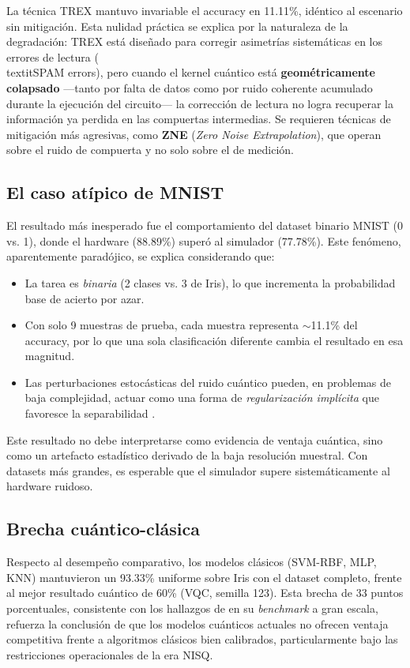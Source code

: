 La t\'ecnica TREX mantuvo invariable el accuracy en 11.11\%, id\'entico al escenario sin mitigaci\'on. Esta nulidad pr\'actica se explica por la naturaleza de la degradaci\'on: TREX est\'a dise\~nado para corregir asimetr\'ias sistem\'aticas en los errores de lectura (\\textit{SPAM errors}), pero cuando el kernel cu\'antico est\'a \textbf{geom\'etricamente colapsado} ---tanto por falta de datos como por ruido coherente acumulado durante la ejecuci\'on del circuito--- la correcci\'on de lectura no logra recuperar la informaci\'on ya perdida en las compuertas intermedias. Se requieren t\'ecnicas de mitigaci\'on m\'as agresivas, como \textbf{ZNE} (\textit{Zero Noise Extrapolation}), que operan sobre el ruido de compuerta y no solo sobre el de medici\'on.

\subsection{El caso at\'ipico de MNIST}

El resultado m\'as inesperado fue el comportamiento del dataset binario MNIST (0 vs. 1), donde el hardware (88.89\%) super\'o al simulador (77.78\%). Este fen\'omeno, aparentemente parad\'ojico, se explica considerando que:

\begin{itemize}
    \item La tarea es \emph{binaria} (2 clases vs. 3 de Iris), lo que incrementa la probabilidad base de acierto por azar.
    \item Con solo 9 muestras de prueba, cada muestra representa $\sim$11.1\% del accuracy, por lo que una sola clasificaci\'on diferente cambia el resultado en esa magnitud.
    \item Las perturbaciones estoc\'asticas del ruido cu\'antico pueden, en problemas de baja complejidad, actuar como una forma de \textit{regularizaci\'on impl\'icita} que favoresce la separabilidad \citep{huang2021}.
\end{itemize}

\noindent Este resultado no debe interpretarse como evidencia de ventaja cu\'antica, sino como un artefacto estad\'istico derivado de la baja resoluci\'on muestral. Con datasets m\'as grandes, es esperable que el simulador supere sistem\'aticamente al hardware ruidoso.

\subsection{Brecha cu\'antico-cl\'asica}

Respecto al desempe\~no comparativo, los modelos cl\'asicos (SVM-RBF, MLP, KNN) mantuvieron un 93.33\% uniforme sobre Iris con el dataset completo, frente al mejor resultado cu\'antico de 60\% (VQC, semilla 123). Esta brecha de 33 puntos porcentuales, consistente con los hallazgos de \citet{bowles2024} en su \textit{benchmark} a gran escala, refuerza la conclusi\'on de que los modelos cu\'anticos actuales no ofrecen ventaja competitiva frente a algoritmos cl\'asicos bien calibrados, particularmente bajo las restricciones operacionales de la era NISQ.
